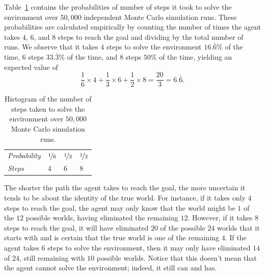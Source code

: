 Table~\ref{tab:histogram} contains the probabilities of number of steps it took
to solve the environment over $50,000$ independent Monte Carlo simulation runs.
These probabilities are calculated empirically by counting the number of times
the agent takes $4$, $6$, and $8$ steps to reach the goal and dividing by the
total number of runs. We observe that it takes $4$ steps to solve the
environment $16.\bar{6}\%$ of the time, $6$ steps $33.\bar{3}\%$ of the time,
and $8$ steps $50\%$ of the time, yielding an expected value of 
%
\[
\frac{1}{6} \times 4 + \frac{1}{3} \times 6 + \frac{1}{2} \times 8 = \frac{20}{3} = 6.\bar{6}.
\]
%
%
\begin{table}[b]
    \caption{Histogram of the number of steps taken to solve the environment 
    over $50,000$ Monte Carlo simulation runs.}
    \label{tab:histogram}
    \centering
    \begin{tabular}{*4l} \toprule
        \textit{Probability} & $\nicefrac{1}{6}$ & $\nicefrac{1}{3}$ & $\nicefrac{1}{2}$ \\
        \textit{Steps} & $4$ & $6$ & $8$ \\
    \bottomrule
    \hline
    \end{tabular}
\end{table}
%
The shorter the path the agent takes to reach the goal, the more uncertain it
tends to be about the identity of the true world. For instance, if it takes only
$4$ steps to reach the goal, the agent may only know that the world might be 
$1$ of the $12$ possible worlds, having eliminated the remaining $12$. However, 
if it takes $8$ steps to reach the goal, it will have eliminated $20$ of the 
possible $24$ worlds that it starts with and is certain that the true world is 
one of the remaining $4$. If the agent takes $6$ steps to solve the environment,
then it may only have eliminated $14$ of $24$, still remaining with $10$ possible worlds. Notice that this doesn't mean that the agent cannot solve the 
environment; indeed, it still can and has.

